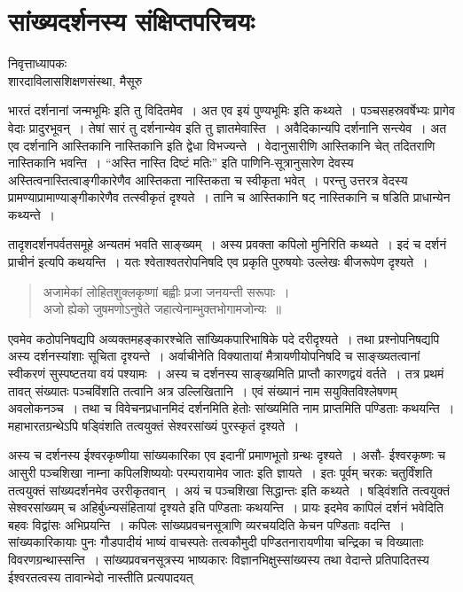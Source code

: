 {\fontsize{15}{17}\selectfont
\presetvalues
\chapter{सांख्यदर्शनस्य संक्षिप्तपरिचयः}

\begin{center}
\smallskip

निवृत्ताध्यापकः\\
शारदाविलासशिक्षणसंस्था, मैसूरु
\addrule
\end{center}

भारतं दर्शनानां जन्मभूमिः इति तु विदितमेव~। अत एव इयं पुण्यभूमिः इति कथ्यते~। पञ्चसहस्रवर्षेभ्यः प्रागेव वेदाः प्रादुरभूवन्~। तेषां सारं तु दर्शनान्येव इति तु ज्ञातमेवास्ति~। अवैदिकान्यपि दर्शनानि सन्त्येव~। अत एव दर्शनानि आस्तिकानि नास्तिकानि इति द्वेधा विभज्यन्ते~। वेदानुसारीणि आस्तिकानि चेत् तदितराणि नास्तिकानि भवन्ति~। “अस्ति नास्ति दिष्टं मतिः” इति पाणिनि-सूत्रानुसारेण देवस्य अस्तित्वनास्तित्वाङ्गीकारेणैव आस्तिकता नास्तिकता च स्वीकृता भवेत्~। परन्तु उत्तरत्र वेदस्य प्रामण्याप्रामाण्याङ्गीकारेणैव तत्स्वीकृतं दृश्यते~। तानि च आस्तिकानि षट् नास्तिकानि च षडिति प्राधान्येन कथ्यन्ते~। 

तादृशदर्शनपर्वतसमूहे अन्यतमं भवति साङ्ख्यम्~। अस्य प्रवक्ता कपिलो मुनिरिति कथ्यते~। इदं च दर्शनं प्राचीनं इत्यपि कथयन्ति~। यतः श्वेताश्वतरोपनिषदि एव प्रकृति पुरुषयोः उल्लेखः बीजरूपेण दृश्यते~। 
\begin{verse}
अजामेकां लोहितशुक्लकृष्णां बह्वीः प्रजा जनयन्ती सरूपाः~।\\
अजो ह्येको जुषमणोऽनुषेते जहात्येनाम्भुक्तभोगामजोन्यः~॥
\end{verse}
एवमेव कठोपनिषद्यपि अव्यक्तमहङ्कारश्चेति सांख्यिकपारिभाषिके पदे दरीदृश्यते~। तथा प्रश्नोपनिषद्यपि अस्य दर्शनस्यांशाः सूचिता दृश्यन्ते~। अर्वाचीनेति विक्यातायां मैत्रायणीयोपनिषदि च साङ्ख्यतत्वानां स्वीकरणं सुस्पष्टतया वयं पश्यामः~। अस्य च दर्शनस्य साङ्ख्य़मिति प्राप्तौ कारणद्वयं वर्तते~। तत्र प्रथमं तावत् संख्यातः पञ्चविंशति तत्वानि अत्र उल्लिखितानि~। एवं संख्यानं नाम सयुक्तिविश्लेषणम् अवलोकनञ्च~। तथा च विवेचनप्रधानमिदं दर्शनमिति हेतोः सांख्यमिति नाम प्राप्तमिति पण्डिताः कथयन्ति~। महाभारतग्रन्थेऽपि षड्विंशति तत्वयुक्तं सेश्वरसांख्यं पुरस्कृतं दृश्यते~। 

अस्य च दर्शनस्य ईश्वरकृष्णीया सांख्यकारिका एव इदानीं प्रमाणभूतो ग्रन्थः दृश्यते~। असौ- ईश्वरकृष्णः च आसुरी पञ्चशिखा नाम्ना कपिलशिष्ययोः परम्परायामेव जातः इति ज्ञायते~। इतः पूर्वम् चरकः चतुर्विंशति तत्वयुक्तं सांख्यदर्शनमेव उररीकृतवान्~। अयं च पञ्चशिखा सिद्धान्तः इति कथ्यते~। षड्विंशति तत्वयुक्तं सेश्वरसांख्यम् च अहिर्बुध्न्यसंहितायां दृश्यते इति पण्डिताः कथयन्ति~। प्रायः इदमेव कापिलं दर्शनं भवेदिति बहवः विद्वांसः अभिप्रयन्ति~। कपिलः सांख्यप्रवचनसूत्राणि व्यरचयदिति केचन पण्डिताः वदन्ति~। सांख्यकारिकायाः पुनः गौडपादीयं भाष्यं वाचस्पतेः तत्वकौमुदी पण्डितनारायणीया चन्द्रिका च विख्याताः विवरणग्रन्थास्सन्ति~। सांख्यप्रवचनसूत्रस्य भाष्यकारः विज्ञानभिक्षुस्सांख्यस्य तथा वेदान्ते प्रतिपादितस्य ईश्वरतत्वस्य तावान्भेदो नास्तीति प्रत्यपादयत् 

}
